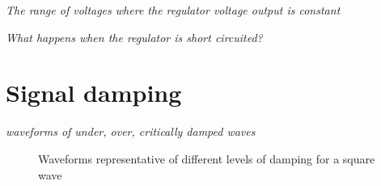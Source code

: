 \documentclass[11pt]{article}
\begin{document}
{\em The range of voltages where the regulator voltage output is constant}

{\em What happens when the regulator is short circuited?}

\section{Signal damping}
{\em waveforms of under, over, critically damped waves}

\begin{figure}
	\centering
	\caption{Waveforms representative of different levels of damping for a square wave}
	\label{fig:damping}
\end{figure}
\end{document}
